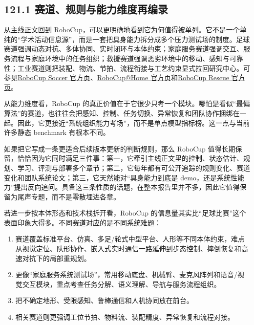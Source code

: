\subsection*{121.1 赛道、规则与能力维度再编录}


从主线正文回到 RoboCup，可以更明确地看到它为何值得被单列。它不是一个单纯的“学术活动信息源”，而是一套把具身能力拆分成多个压力测试场的制度。足球赛道强调动态对抗、多体协同、实时闭环与本体约束；家庭服务赛道强调交互、服务流程与家庭环境中的任务组织；救援赛道强调恶劣环境中的移动、感知与可靠性；工业赛道则把装配、物流、节拍、流程衔接与工艺约束显式拉回研究中心。可参见\href{https://www.robocup.org/domains/1}{RoboCup Soccer 官方页}、\href{https://athome.robocup.org/}{RoboCup@Home 官方页}和\href{https://www.robocup.org/domains/2}{RoboCup Rescue 官方页}。

从能力维度看，RoboCup 的真正价值在于它很少只考一个模块。哪怕是看似“最偏算法”的赛道，也往往会把感知、控制、任务切换、异常恢复和团队协作捆绑在一起。因此，它更接近“系统组织能力考场”，而不是单点模型指标榜。这一点与当前许多静态 benchmark 有根本不同。

如果把它写成一条更适合后续版本更新的判断规则，那么 RoboCup 值得长期保留，恰恰因为它同时满足三件事：第一，它牵引主线正文里的控制、状态估计、规划、学习、评测与部署多个章节；第二，它每年都有可公开追踪的规则变化、赛道变化和团队系统论文；第三，它天然能对“具身能力到底是 demo，还是系统性能力”提出反向追问。具备这三条性质的话题，在整本报告里并不多，因此它值得保留为尾声专题，而不是零散埋进各章。

若进一步按本体形态和技术栈拆开看，RoboCup 的信息量其实比“足球比赛”这个表面印象大得多。不同赛道对应的是不同系统难题：

\begin{enumerate}
\item \texttt{} 赛道覆盖标准平台、仿真、多足/轮式中型平台、人形等不同本体约束，难点从视觉定位、队形协作、嵌入式实时通信一路延伸到步态控制、摔倒恢复和高速对抗下的局部重规划。
\item \texttt{} 更像“家庭服务系统测试场”，常用移动底盘、机械臂、麦克风阵列和语音/视觉交互模块，重点考查任务分解、语义理解、导航与服务流程组织。
\item \texttt{} 把不确定地形、受限感知、鲁棒通信和人机协同放在前台。
\item \texttt{} 相关赛道则更强调工位节拍、物料流、装配精度、异常恢复和流程对接。
\end{enumerate}

